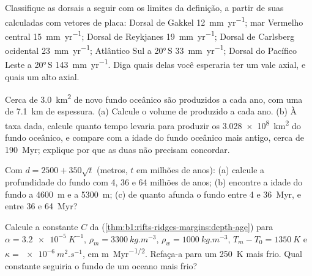 \begin{exercise}[$\star$]\label{exo:b1:rifts-ridges-margins:3}
Classifique as dorsais a seguir com os limites da definição, a partir de suas  calculadas com vetores de placa: Dorsal de Gakkel
\qty{12}{mm.yr^{-1}}; mar Vermelho central \qty{15}{mm.yr^{-1}}; Dorsal de Reykjanes
\qty{19}{mm.yr^{-1}}; Dorsal de Carlsberg ocidental \qty{23}{mm.yr^{-1}}; Atlântico Sul a \ang{20}\,S \qty{33}{mm.yr^{-1}}; Dorsal do Pacífico Leste a
\ang{20}\,S \qty{143}{mm.yr^{-1}}. Diga quais delas você esperaria ter um vale axial, e quais um alto axial.
\end{exercise}

\begin{exercise}[$\star$]\label{exo:b1:rifts-ridges-margins:4}
Cerca de \qty{3.0}{km^2} de novo fundo oceânico são produzidos a cada ano, com uma  de \qty{7.1}{km} de espessura. (a) Calcule o volume de  produzido a cada ano. (b) À taxa dada, calcule quanto tempo levaria para produzir os \qty{3.028e8}{km^2} do fundo oceânico, e compare com a idade do fundo oceânico mais antigo, cerca de \qty{190}{Myr}; explique por que as duas não precisam concordar.
\end{exercise}

\begin{exercise}[$\star\star$]\label{exo:b1:rifts-ridges-margins:5}
Com $d = 2500 + 350\sqrt t$ (metros, $t$ em milhões de anos): (a) calcule a profundidade do fundo com 4, 36 e 64 milhões de anos;
(b) encontre a idade do fundo a \qty{4600}{m} e a \qty{5300}{m}; (c) de quanto afunda o fundo entre 4 e \qty{36}{Myr}, e entre 36 e \qty{64}{Myr}?
\end{exercise}

\begin{exercise}[$\star\star$]\label{exo:b1:rifts-ridges-margins:6}
Calcule a constante $C$ da 
(\cref{thm:b1:rifts-ridges-margins:depth-age}) para $\alpha =
\qty{3.2e-5}{K^{-1}}$, $\rho_m = \qty{3300}{kg.m^{-3}}$, $\rho_w =
\qty{1000}{kg.m^{-3}}$, $T_m - T_0 = \qty{1350}{K}$ e $\kappa =
\qty{e-6}{m^2.s^{-1}}$, em \unit{m.Myr^{-1/2}}. Refaça-a para um 
\qty{250}{K} mais frio. Qual constante seguiria o fundo de um oceano mais frio?
\end{exercise}

